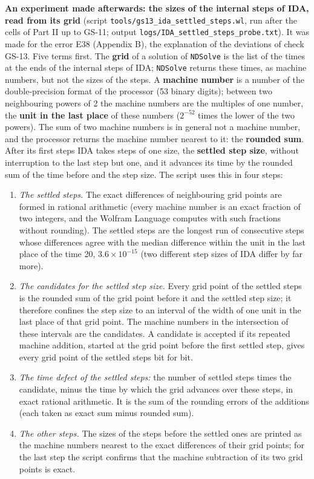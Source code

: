\documentclass[
  10pt,
]{article}
\providecommand{\tightlist}{%
  \setlength{\itemsep}{0pt}\setlength{\parskip}{0pt}}
\begin{document}
\textbf{An experiment made afterwards: the sizes of the internal steps
of IDA, read from its grid} (script
\texttt{tools/gs13\_ida\_settled\_steps.wl}, run after the cells of Part
II up to GS-11; output \texttt{logs/IDA\_settled\_steps\_probe.txt}). It
was made for the error E38 (Appendix B), the explanation of the
deviations of check GS-13. Five terms first. The \textbf{grid} of a
solution of \texttt{NDSolve} is the list of the times at the ends of the
internal steps of IDA; \texttt{NDSolve} returns these times, as machine
numbers, but not the sizes of the steps. A \textbf{machine number} is a
number of the double-precision format of the processor (53 binary
digits); between two neighbouring powers of 2 the machine numbers are
the multiples of one number, the \textbf{unit in the last place} of
these numbers (\(2^{-52}\) times the lower of the two powers). The sum
of two machine numbers is in general not a machine number, and the
processor returns the machine number nearest to it: the \textbf{rounded
sum}. After its first steps IDA takes steps of one size, the
\textbf{settled step size}, without interruption to the last step but
one, and it advances its time by the rounded sum of the time before and
the step size. The script uses this in four steps:

\begin{enumerate}
\def\labelenumi{\arabic{enumi}.}
\tightlist
\item
  \emph{The settled steps.} The exact differences of neighbouring grid
  points are formed in rational arithmetic (every machine number is an
  exact fraction of two integers, and the Wolfram Language computes with
  such fractions without rounding). The settled steps are the longest
  run of consecutive steps whose differences agree with the median
  difference within the unit in the last place of the time 20,
  \(3.6\times10^{-15}\) (two different step sizes of IDA differ by far
  more).
\item
  \emph{The candidates for the settled step size.} Every grid point of
  the settled steps is the rounded sum of the grid point before it and
  the settled step size; it therefore confines the step size to an
  interval of the width of one unit in the last place of that grid
  point. The machine numbers in the intersection of these intervals are
  the candidates. A candidate is accepted if its repeated machine
  addition, started at the grid point before the first settled step,
  gives every grid point of the settled steps bit for bit.
\item
  \emph{The time defect of the settled steps:} the number of settled
  steps times the candidate, minus the time by which the grid advances
  over these steps, in exact rational arithmetic. It is the sum of the
  rounding errors of the additions (each taken as exact sum minus
  rounded sum).
\item
  \emph{The other steps.} The sizes of the steps before the settled ones
  are printed as the machine numbers nearest to the exact differences of
  their grid points; for the last step the script confirms that the
  machine subtraction of its two grid points is exact.
\end{enumerate}
\end{document}
